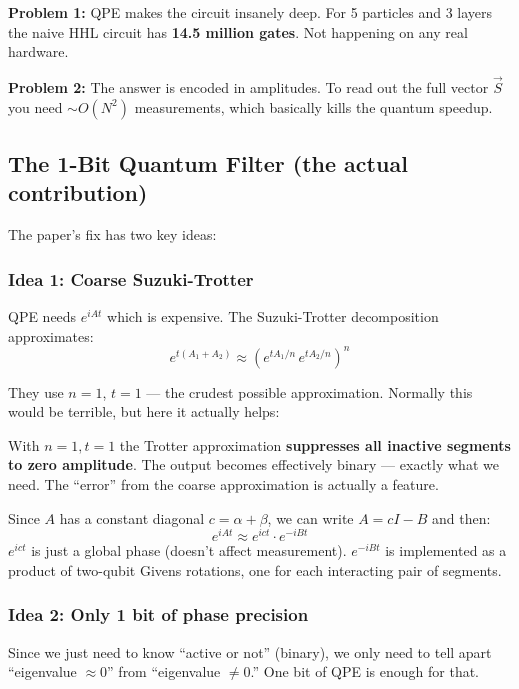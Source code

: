 \documentclass[11pt, a4paper]{article}
\begin{document}
\begin{tcolorbox}[imp]
\textbf{Problem 1:} QPE makes the circuit insanely deep. For 5 particles
and 3 layers the naive HHL circuit has \textbf{14.5 million gates}. Not
happening on any real hardware.

\textbf{Problem 2:} The answer is encoded in amplitudes. To read out the
full vector $\vec{S}$ you need $\sim O(N^2)$ measurements, which basically
kills the quantum speedup.
\end{tcolorbox}

\subsection{The 1-Bit Quantum Filter (the actual contribution)}

The paper's fix has two key ideas:

\subsubsection{Idea 1: Coarse Suzuki-Trotter}

QPE needs $e^{iAt}$ which is expensive. The Suzuki-Trotter decomposition
approximates:
\[
  e^{t(A_1+A_2)} \approx \left(e^{tA_1/n}\, e^{tA_2/n}\right)^n
\]

They use $n=1$, $t=1$ --- the crudest possible approximation. Normally this
would be terrible, but here it actually helps:

\begin{tcolorbox}[nb]
With $n=1, t=1$ the Trotter approximation \textbf{suppresses all inactive
segments to zero amplitude}. The output becomes effectively binary ---
exactly what we need. The ``error'' from the coarse approximation is
actually a feature.
\end{tcolorbox}

Since $A$ has a constant diagonal $c = \alpha + \beta$, we can write
$A = cI - B$ and then:
\[
  e^{iAt} \approx e^{ict} \cdot e^{-iBt}
\]
$e^{ict}$ is just a global phase (doesn't affect measurement). $e^{-iBt}$
is implemented as a product of two-qubit Givens rotations, one for each
interacting pair of segments.

\subsubsection{Idea 2: Only 1 bit of phase precision}

Since we just need to know ``active or not'' (binary), we only need to tell
apart ``eigenvalue $\approx 0$'' from ``eigenvalue $\neq 0$.'' One bit of
QPE is enough for that.
\end{document}
